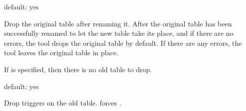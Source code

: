 \documentclass[letterpaper,10pt,english]{sphinxmanual}
\begin{document}

\begin{fulllineitems}
\label{\detokenize{mariadb-schema-change:cmdoption-mariadb-schema-change-no-drop-old-table}}
\sphinxAtStartPar
default: yes

\sphinxAtStartPar
Drop the original table after renaming it. After the original table has been
successfully renamed to let the new table take its place, and if there are no
errors, the tool drops the original table by default. If there are any errors,
the tool leaves the original table in place.

\sphinxAtStartPar
If  is specified, then there is no old table to drop.

\end{fulllineitems}


\begin{fulllineitems}
\label{\detokenize{mariadb-schema-change:cmdoption-mariadb-schema-change-no-drop-triggers}}
\sphinxAtStartPar
default: yes

\sphinxAtStartPar
Drop triggers on the old table.   forces
.

\end{fulllineitems}
\end{document}
